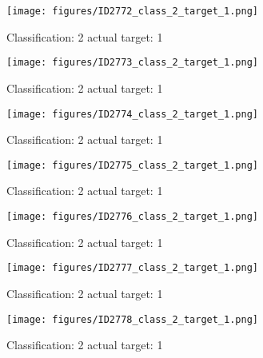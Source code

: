 \begin{figure}[h!]
\begin{center}
\texttt{[image: figures/ID2772\_class\_2\_target\_1.png]}
\end{center}
\caption{ Classification: 2 actual target: 1}
\label{fig:ID2772_class_2_target_1}
\end{figure}
\begin{figure}[h!]
\begin{center}
\texttt{[image: figures/ID2773\_class\_2\_target\_1.png]}
\end{center}
\caption{ Classification: 2 actual target: 1}
\label{fig:ID2773_class_2_target_1}
\end{figure}
\begin{figure}[h!]
\begin{center}
\texttt{[image: figures/ID2774\_class\_2\_target\_1.png]}
\end{center}
\caption{ Classification: 2 actual target: 1}
\label{fig:ID2774_class_2_target_1}
\end{figure}
\begin{figure}[h!]
\begin{center}
\texttt{[image: figures/ID2775\_class\_2\_target\_1.png]}
\end{center}
\caption{ Classification: 2 actual target: 1}
\label{fig:ID2775_class_2_target_1}
\end{figure}
\begin{figure}[h!]
\begin{center}
\texttt{[image: figures/ID2776\_class\_2\_target\_1.png]}
\end{center}
\caption{ Classification: 2 actual target: 1}
\label{fig:ID2776_class_2_target_1}
\end{figure}
\begin{figure}[h!]
\begin{center}
\texttt{[image: figures/ID2777\_class\_2\_target\_1.png]}
\end{center}
\caption{ Classification: 2 actual target: 1}
\label{fig:ID2777_class_2_target_1}
\end{figure}
\begin{figure}[h!]
\begin{center}
\texttt{[image: figures/ID2778\_class\_2\_target\_1.png]}
\end{center}
\caption{ Classification: 2 actual target: 1}
\label{fig:ID2778_class_2_target_1}
\end{figure}
